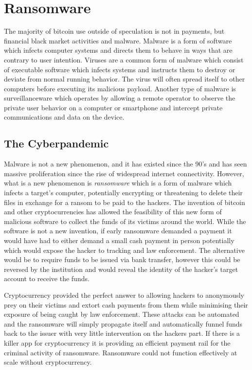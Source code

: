 \chapter{Ransomware}


The majority of bitcoin use outside of speculation is not in payments, but
financial black market activities and malware. Malware is a form of software
which infects computer systems and directs them to behave in ways that are
contrary to user intention.  Viruses are a common form of malware which consist
of executable software which infects systems and instructs them to destroy or
deviate from normal running behavior. The virus will often spread itself to
other computers before executing its malicious payload. Another type of malware
is surveillanceware which operates by allowing a remote operator to observe the
private user behavior on a computer or smartphone and intercept private
communications and data on the device.

\section{The Cyberpandemic}

Malware is not a new phenomenon, and it has existed since the 90's and has seen
massive proliferation since the rise of widespread internet connectivity.
However, what is a new phenomenon is \textit{ransomware} which is a form of
malware which infects a target's computer, potentially encrypting or threatening
to delete their files in exchange for a ransom to be paid to the hackers. The
invention of bitcoin and other cryptocurrencies has allowed the feasibility of
this new form of malicious software to collect the funds of its victims around
the world.  While the software is not a new invention, if early ransomware
demanded a payment it would have had to either demand a small cash payment in
person potentially which would expose the hacker to tracking and law
enforcement. The alternative would be to require funds to be issued via bank
transfer, however this could be reversed by the institution and would reveal the
identity of the hacker's target account to receive the funds.

Cryptocurrency provided the perfect answer to allowing hackers to anonymously
prey on their victims and extort cash payments from them while minimising their
exposure of being caught by law enforcement. These attacks can be automated and
the ransomware will simply propagate itself and automatically funnel funds back
to the issuer with very little intervention on the hackers part. If there is a
killer app for cryptocurrency it is providing an efficient payment rail for the
criminal activity of ransomware. Ransomware could not function effectively
at scale without cryptocurrency.

